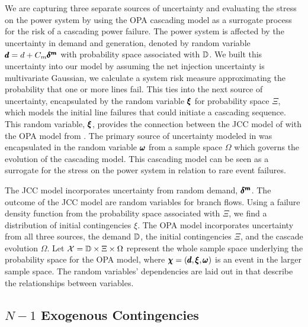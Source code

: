 We are capturing three separate sources of uncertainty and evaluating the stress on the power system by using the OPA cascading model as a surrogate process for the risk of a cascading power failure.  The power system is affected by the uncertainty in demand and generation, denoted by random variable $\pmb{d} = d + C_m \pmb{\delta^m}$ with  probability space associated with $\mathbb{D}$.  We built this uncertainty into our model by assuming the net injection uncertainty is multivariate Gaussian, we calculate a system risk measure approximating the probability that one or more lines fail.  This ties into the next source of uncertainty, encapsulated by the  random variable $\pmb{\xi}$ for probability space $\Xi$, which models the initial line failures that could initiate a cascading sequence.  This random variable, $\pmb{\xi}$, provides the connection between the JCC model of  with the OPA model from .  The primary source of uncertainty modeled in  was encapsulated in the random variable  $\pmb{\omega}$ from a sample space $\Omega$ which governs the evolution of the cascading model.  This cascading model can be seen as a surrogate for the stress on the power system in relation to rare event failures.     

The JCC model incorporates uncertainty from random demand, $\pmb{\delta^m}$.  The outcome of the JCC model are random variables for branch flows.  Using a failure density function from the probability space associated with $\Xi$, we find a distribution of initial contingencies $\xi$.  The OPA model incorporates uncertainty from all three sources, the demand $\mathbb{D}$, the initial contingencies $\Xi$, and the cascade evolution $\Omega$.  Let $\mathcal{X} = \mathbb{D} \times \Xi \times \Omega$ represent the whole sample space underlying the probability space for the OPA model, where $\pmb{\chi} = (\pmb{d}, \pmb{\xi}, \pmb{\omega})$ is an event in the larger sample space.  The random variables' dependencies are laid out in  that describe the relationships between variables.



\subsection{$N-1$ Exogenous Contingencies}

